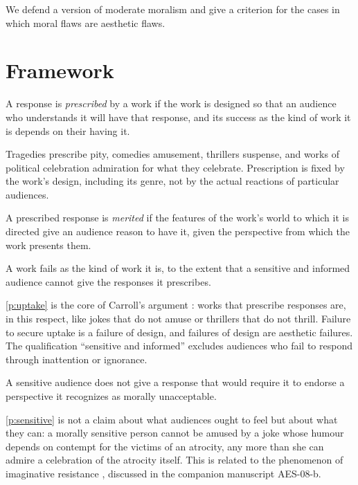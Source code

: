 \documentclass{situationist-preprint}
\begin{document}
We defend a version of moderate moralism and give a criterion for the cases in which moral flaws are aesthetic flaws.

\section{Framework}

\begin{definition}\label{d:prescribed}
A response is \emph{prescribed} by a work if the work is designed so that an audience who understands it will have that response, and its success as the kind of work it is depends on their having it.
\end{definition}

Tragedies prescribe pity, comedies amusement, thrillers suspense, and works of political celebration admiration for what they celebrate. Prescription is fixed by the work's design, including its genre, not by the actual reactions of particular audiences.

\begin{definition}\label{d:merited}
A prescribed response is \emph{merited} if the features of the work's world to which it is directed give an audience reason to have it, given the perspective from which the work presents them.
\end{definition}

\begin{principle}[Uptake]\label{p:uptake}
A work fails as the kind of work it is, to the extent that a sensitive and informed audience cannot give the responses it prescribes.
\end{principle}

\ref{p:uptake} is the core of Carroll's argument \citep{Carroll1996}: works that prescribe responses are, in this respect, like jokes that do not amuse or thrillers that do not thrill. Failure to secure uptake is a failure of design, and failures of design are aesthetic failures. The qualification \enquote{sensitive and informed} excludes audiences who fail to respond through inattention or ignorance.

\begin{principle}\label{p:sensitive}
A sensitive audience does not give a response that would require it to endorse a perspective it recognizes as morally unacceptable.
\end{principle}

\ref{p:sensitive} is not a claim about what audiences ought to feel but about what they can: a morally sensitive person cannot be amused by a joke whose humour depends on contempt for the victims of an atrocity, any more than she can admire a celebration of the atrocity itself. This is related to the phenomenon of imaginative resistance \citep{Walton1994,Gendler2000}, discussed in the companion manuscript AES-08-b.
\end{document}
